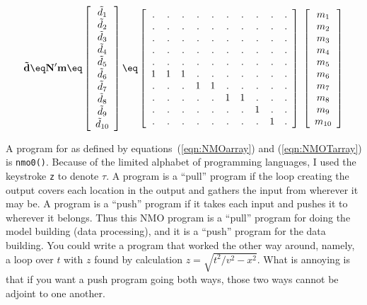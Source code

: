 \begin{equation}
{\bf \tilde d \eq N' m } \eq
 \left[ 
  \begin{array}{c}
   \tilde d_1 \\ 
   \tilde d_2 \\
   \tilde d_3 \\
   \tilde d_4 \\
   \tilde d_5 \\
   \tilde d_6 \\
   \tilde d_7 \\
   \tilde d_8 \\
   \tilde d_9 \\
   \tilde d_{10}
  \end{array}
 \right] 
\eq
 \left[ 
  \begin{array}{cccccccccc}
   .&.&.&.&.&.&.&.&.&. \\
   .&.&.&.&.&.&.&.&.&. \\
   .&.&.&.&.&.&.&.&.&. \\
   .&.&.&.&.&.&.&.&.&. \\
   .&.&.&.&.&.&.&.&.&. \\
   1&1&1&.&.&.&.&.&.&. \\
   .&.&.&1&1&.&.&.&.&. \\
   .&.&.&.&.&1&1&.&.&. \\
   .&.&.&.&.&.&.&1&.&. \\
   .&.&.&.&.&.&.&.&1&.
  \end{array}
 \right] \;
 \left[ 
  \begin{array}{c}
   m_1 \\ 
   m_2 \\
   m_3 \\
   m_4 \\
   m_5 \\
   m_6 \\
   m_7 \\
   m_8 \\
   m_9 \\
   m_{10}
  \end{array}
 \right] 
\label{eqn:NMOTarray}
\end{equation}

A program for  as defined by
equations~(\ref{eqn:NMOarray}) and (\ref{eqn:NMOTarray})
is {\tt nmo0()}.
Because of the limited alphabet of programming languages,
I used the keystroke {\tt z} to denote $\tau$.%
A program is a ``pull'' program if the loop creating the output
covers each location in the output and gathers the input from wherever
it may be.
A program is a ``push'' program if it takes each input and
pushes it to wherever it belongs.
Thus this NMO program is a ``pull'' program
for doing the model building (data processing),
and it is a ``push'' program for the data building.
You could write a program that worked the other way around,
namely, a loop over $t$ with $z$ found
by calculation $z=\sqrt{t^2/v^2-x^2}$.
What is annoying is that if you want a push program going
both ways, those two ways cannot be adjoint to one another.

